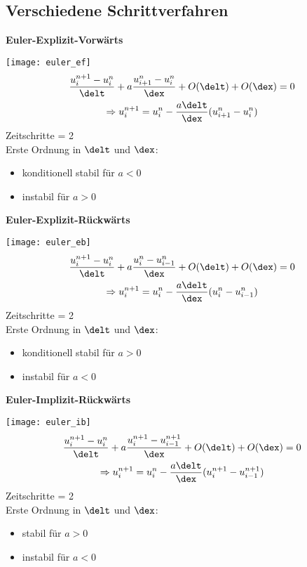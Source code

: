 \subsection{Verschiedene Schrittverfahren}
\textbf{Euler-Explizit-Vorw\"arts}
\begin{multicols}{2}
	\texttt{[image: euler\_ef]}
\columnbreak
	\begin{multline*}
		\frac{u^{n+1}_i - u^n_i}{\delt} + a\frac{u^{n}_{i+1} - u^n_i}{\dex} + O(\delt) + O(\dex) = 0 \\
		\Rightarrow u^{n+1}_i = u^n_i - \frac{a\delt}{\dex}(u^n_{i+1} - u^n_i)
	\end{multline*}
	Zeitschritte = 2\\
	Erste Ordnung in $\delt$ und $\dex$: 
	\begin{itemize}
		\item konditionell stabil f\"ur $a<0$
		\item instabil f\"ur $a>0$
	\end{itemize}
\end{multicols}

\newpage

\textbf{Euler-Explizit-R\"uckw\"arts}
\begin{multicols}{2}
	\texttt{[image: euler\_eb]}
\columnbreak
	\begin{multline*}
		\frac{u^{n+1}_i - u^n_i}{\delt} + a\frac{u^{n}_i - u^n_{i-1}}{\dex} + O(\delt) + O(\dex) = 0 \\
		\Rightarrow u^{n+1}_i = u^n_i - \frac{a\delt}{\dex}(u^n_{i} - u^n_{i-1})
	\end{multline*}
	Zeitschritte = 2\\
	Erste Ordnung in $\delt$ und $\dex$: 
	\begin{itemize}
		\item konditionell stabil f\"ur $a>0$
		\item instabil f\"ur $a<0$
	\end{itemize}
\end{multicols}

\textbf{Euler-Implizit-R\"uckw\"arts}
\begin{multicols}{2}
	\texttt{[image: euler\_ib]}
\columnbreak
	\begin{multline*}
		\frac{u^{n+1}_i - u^n_i}{\delt} + a\frac{u^{n+1}_i - u^{n+1}_{i-1}}{\dex} + O(\delt) + O(\dex) = 0 \\
		\Rightarrow u^{n+1}_i = u^n_i - \frac{a\delt}{\dex}(u^{n+1}_{i} - u^{n+1}_{i-1})
	\end{multline*}
	Zeitschritte = 2\\
	Erste Ordnung in $\delt$ und $\dex$: 
	\begin{itemize}
		\item stabil f\"ur $a>0$
		\item instabil f\"ur $a<0$
	\end{itemize}
\end{multicols}

